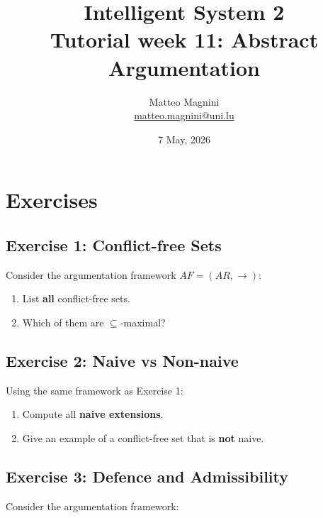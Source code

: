 \documentclass[11pt]{article}
\title{
    Intelligent System 2\\
    Tutorial week 11: Abstract Argumentation
}
\author{
    Matteo Magnini\\
    \href{mailto:matteo.magnini@uni.lu}{matteo.magnini@uni.lu}
}
\date{
    7 May, 2026
}
\begin{document}
\maketitle

\section{Exercises}

\subsection{Exercise 1: Conflict-free Sets}

Consider the argumentation framework $AF = (AR, \to)$:

\begin{center}
\end{center}

\begin{enumerate}
    \item List \textbf{all} conflict-free sets.
    \item Which of them are $\subseteq$-maximal?
\end{enumerate}

\subsection{Exercise 2: Naive vs Non-naive}

Using the same framework as Exercise 1:

\begin{enumerate}
    \item Compute all \textbf{naive extensions}.
    \item Give an example of a conflict-free set that is \textbf{not} naive.
\end{enumerate}

\subsection{Exercise 3: Defence and Admissibility}

Consider the argumentation framework:
\end{document}
